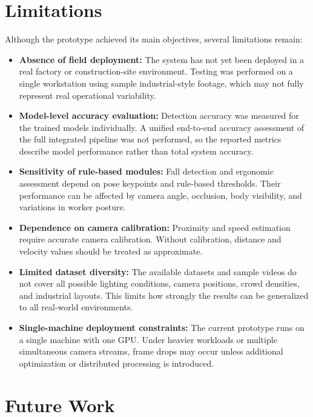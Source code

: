 \section{Limitations}

Although the prototype achieved its main objectives, several limitations remain:

\begin{itemize}
\item \textbf{Absence of field deployment:} The system has not yet been deployed in a real factory or construction-site environment. Testing was performed on a single workstation using sample industrial-style footage, which may not fully represent real operational variability.

\item \textbf{Model-level accuracy evaluation:} Detection accuracy was measured for the trained models individually. A unified end-to-end accuracy assessment of the full integrated pipeline was not performed, so the reported metrics describe model performance rather than total system accuracy.

\item \textbf{Sensitivity of rule-based modules:} Fall detection and ergonomic assessment depend on pose keypoints and rule-based thresholds. Their performance can be affected by camera angle, occlusion, body visibility, and variations in worker posture.

\item \textbf{Dependence on camera calibration:} Proximity and speed estimation require accurate camera calibration. Without calibration, distance and velocity values should be treated as approximate.

\item \textbf{Limited dataset diversity:} The available datasets and sample videos do not cover all possible lighting conditions, camera positions, crowd densities, and industrial layouts. This limits how strongly the results can be generalized to all real-world environments.

\item \textbf{Single-machine deployment constraints:} The current prototype runs on a single machine with one GPU. Under heavier workloads or multiple simultaneous camera streams, frame drops may occur unless additional optimization or distributed processing is introduced.
\end{itemize}

\section{Future Work}

